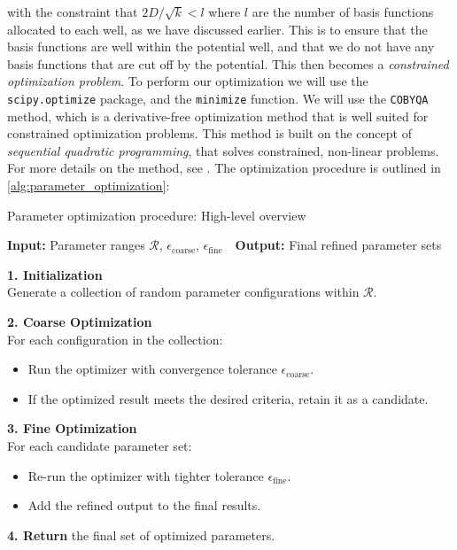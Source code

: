 \documentclass{subfiles}
\begin{document}
with the constraint that $2D / \sqrt{k} < l$ where $l$ are the number of basis functions allocated to each well, as we have discussed earlier. This is to ensure that the basis functions are well within the potential well, and that we do not have any basis functions that are cut off by the potential. This then becomes a \emph{constrained optimization problem}. To perform our optimization we will use the \texttt{scipy.optimize} package, and the \texttt{minimize} function. We will use the \texttt{COBYQA} method, which is a derivative-free optimization method that is well suited for constrained optimization problems. This method is built on the concept of \emph{sequential quadratic programming}, that solves constrained, non-linear problems. For more details on the method, see \cite{razh_cobyqa}. The optimization procedure is outlined in \ref{alg:parameter_optimization}:
\begin{algorithm}[h!]
\caption{Parameter optimization procedure: High-level overview}
\textbf{Input: }{Parameter ranges \(\mathcal{R}\), \(\epsilon_{\text{coarse}}\), \(\epsilon_{\text{fine}}\)}
\,\,\,\,\textbf{Output: }{Final refined parameter sets}

\textbf{1. Initialization}\\
Generate a collection of random parameter configurations within \(\mathcal{R}\).

\textbf{2. Coarse Optimization}\\
For each configuration in the collection:
\begin{itemize}
  \item Run the optimizer with convergence tolerance \(\epsilon_{\text{coarse}}\).
  \item If the optimized result meets the desired criteria, retain it as a candidate.
\end{itemize}

\textbf{3. Fine Optimization}\\
For each candidate parameter set:
\begin{itemize}
  \item Re-run the optimizer with tighter tolerance \(\epsilon_{\text{fine}}\).
  \item Add the refined output to the final results.
\end{itemize}

\textbf{4. Return} the final set of optimized parameters.
\label{alg:parameter_optimization}
\end{algorithm}
\end{document}
